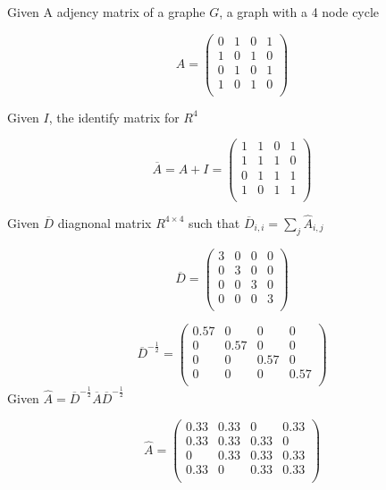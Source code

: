 \documentclass[a4paper]{article}
\begin{document}
Given A adjency matrix of a graphe $G$, a graph with a 4 node cycle

\begin{equation}
A=
\begin{pmatrix}
0 & 1 & 0 & 1\\
1 & 0 & 1 & 0\\
0 & 1 & 0 & 1\\
1 & 0 & 1 & 0\\
\end{pmatrix}
\end{equation}

Given $I$, the identify matrix for $R^{4}$

\begin{equation}
\overline{A} = A + I =
\begin{pmatrix}
1 & 1 & 0 & 1\\
1 & 1 & 1 & 0\\
0 & 1 & 1 & 1\\
1 & 0 & 1 & 1\\
\end{pmatrix}
\end{equation}

Given $\overline{D}$ diagnonal matrix $R^{4 \times 4}$ such that $\overline{D}_{i,i} = \sum_{j} \widehat{A}_{i,j}$

\begin{equation}
\overline{D}=
\begin{pmatrix}
3 & 0 & 0 & 0\\
0 & 3 & 0 & 0\\
0 & 0 & 3 & 0\\
0 & 0 & 0 & 3\\
\end{pmatrix}
\end{equation}

\begin{equation}
\overline{D}^{-\frac{1}{2}}=
\begin{pmatrix}
0.57 & 0 & 0 & 0\\
0 & 0.57 & 0 & 0\\
0 & 0 & 0.57 & 0\\
0 & 0 & 0 & 0.57\\
\end{pmatrix}
\end{equation}
Given $\widehat{A} = \overline{D}^{-\frac{1}{2}} \overline{A} \overline{D}^{-\frac{1}{2}}$

\begin{equation}
\widehat{A} =
\begin{pmatrix}
0.33 & 0.33 & 0 & 0.33\\
0.33 & 0.33 & 0.33 & 0\\
0 & 0.33 & 0.33 & 0.33\\
0.33 & 0 & 0.33 & 0.33\\
\end{pmatrix}
\end{equation}
\end{document}
